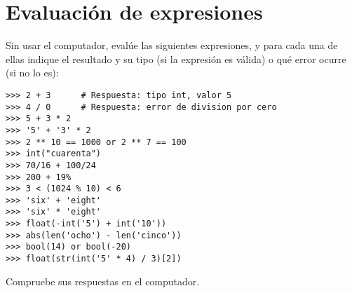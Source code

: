 \section{Evaluación de expresiones}

Sin usar el computador, evalúe las siguientes expresiones, y para cada
una de ellas indique el resultado y su tipo (si la expresión es válida)
o qué error ocurre (si no lo es):

\begin{lstlisting}
>>> 2 + 3      # Respuesta: tipo int, valor 5
>>> 4 / 0      # Respuesta: error de division por cero
>>> 5 + 3 * 2
>>> '5' + '3' * 2
>>> 2 ** 10 == 1000 or 2 ** 7 == 100
>>> int("cuarenta")
>>> 70/16 + 100/24
>>> 200 + 19%
>>> 3 < (1024 % 10) < 6
>>> 'six' + 'eight'
>>> 'six' * 'eight'
>>> float(-int('5') + int('10'))
>>> abs(len('ocho') - len('cinco'))
>>> bool(14) or bool(-20)
>>> float(str(int('5' * 4) / 3)[2])
\end{lstlisting}

Compruebe sus respuestas en el computador.
